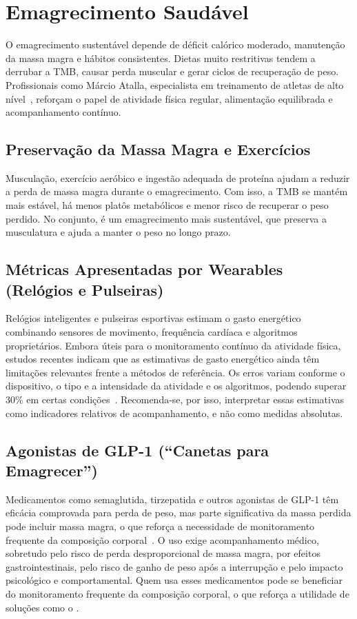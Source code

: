 \section{Emagrecimento Saudável}

O emagrecimento sustentável depende de déficit calórico moderado, manutenção da massa
magra e hábitos consistentes. Dietas muito restritivas tendem a derrubar a TMB, causar
perda muscular e gerar ciclos de recuperação de peso. Profissionais como Márcio Atalla,
especialista em treinamento de atletas de alto nível~\cite{atalla2025}, reforçam o papel
de atividade física regular, alimentação equilibrada e acompanhamento contínuo.

\subsection{Preservação da Massa Magra e Exercícios}

Musculação, exercício aeróbico e ingestão adequada de proteína ajudam a reduzir a perda
de massa magra durante o emagrecimento. Com isso, a TMB se mantém mais estável, há menos
platôs metabólicos e menor risco de recuperar o peso perdido. No conjunto, é um
emagrecimento mais sustentável, que preserva a musculatura e ajuda a manter o peso no
longo prazo.

\subsection{Métricas Apresentadas por Wearables (Relógios e Pulseiras)}

Relógios inteligentes e pulseiras esportivas estimam o gasto energético combinando
sensores de movimento, frequência cardíaca e algoritmos proprietários. Embora úteis para
o monitoramento contínuo da atividade física, estudos recentes indicam que as estimativas
de gasto energético ainda têm limitações relevantes frente a métodos de referência. Os
erros variam conforme o dispositivo, o tipo e a intensidade da atividade e os algoritmos,
podendo superar 30\% em certas condições~\cite{germini2022,doherty2024}. Recomenda-se, por
isso, interpretar essas estimativas como indicadores relativos de acompanhamento, e não
como medidas absolutas.

\subsection{Agonistas de GLP-1 (``Canetas para Emagrecer'')}

Medicamentos como semaglutida, tirzepatida e outros agonistas de GLP-1 têm eficácia
comprovada para perda de peso, mas parte significativa da massa perdida pode incluir massa
magra, o que reforça a necessidade de monitoramento frequente da composição
corporal~\cite{wilding2021}. O uso exige acompanhamento médico, sobretudo pelo risco de
perda desproporcional de massa magra, por efeitos gastrointestinais, pelo risco de ganho
de peso após a interrupção e pelo impacto psicológico e comportamental. Quem usa esses
medicamentos pode se beneficiar do monitoramento frequente da composição corporal, o que
reforça a utilidade de soluções como o \sintonia.


